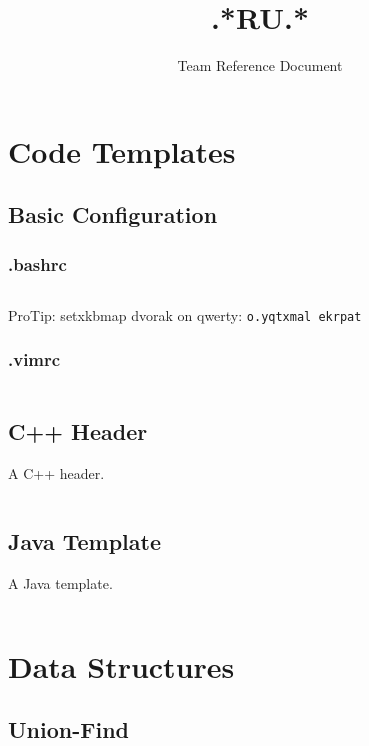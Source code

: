 \documentclass[8pt,a4paper,landscape,oneside]{amsart}
\title{.*RU.*}
\subtitle{Team Reference Document}
\date{\ddmmyyyydate{\today{}}}
\newcommand{\code}[1]{\inputminted[fontsize=\normalsize,baselinestretch=1]{cpp}{_code/#1}}
\newcommand{\bashcode}[1]{\inputminted{bash}{_code/#1}}
\newif\ifverbose
\begin{document}
\begin{multicols*}{3}
\maketitle
\thispagestyle{fancy}
\vspace{-3em}
\tableofcontents



\section{Code Templates}
    \subsection{Basic Configuration}
        \subsubsection{.bashrc}
        \bashcode{bashrc.sh}
        ProTip\texttrademark: setxkbmap dvorak on qwerty: \texttt{o.yqtxmal ekrpat}

        \subsubsection{.vimrc}
        \bashcode{vimrc.sh}

    \subsection{C++ Header}
        A C++ header.
        \code{header.cpp}

    \subsection{Java Template}
        A Java template.
        \code{template.java}


\section{Data Structures}

    \subsection{Union-Find}
        \ifverbose
        An implementation of the Union-Find disjoint sets data structure.
        \fi
        \code{data-structures/union_find.cpp}


\end{multicols*}
\end{document}

